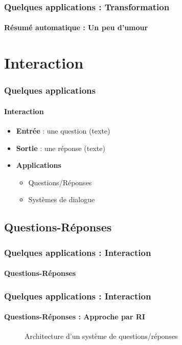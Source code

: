 \documentclass[xcolor=table]{beamer}
\begin{document}
\begin{frame}
	\frametitle{Quelques applications : Transformation}
	\framesubtitle{Résumé automatique : Un peu d'umour}
	
	\begin{center}
	\end{center}
	
\end{frame}

\section{Interaction}

\begin{frame}
	\frametitle{Quelques applications}
	\framesubtitle{Interaction}
	\begin{itemize}
		\item \textbf{Entrée} : une question (texte)
		\item \textbf{Sortie} : une réponse (texte)
		\item \textbf{Applications} 
		\begin{itemize}
			\item Questions/Réponses
			\item Systèmes de dialogue
		\end{itemize}
	\end{itemize}
\end{frame}

\subsection{Questions-Réponses}

\begin{frame}
	\frametitle{Quelques applications : Interaction}
	\framesubtitle{Questions-Réponses}
\end{frame}

\begin{frame}
	\frametitle{Quelques applications : Interaction}
	\framesubtitle{Questions-Réponses : Approche par RI}
	
	\begin{figure}
		\caption{Architecture d'un système de questions/réponses \cite{2019-jurafsky-martin}}
	\end{figure}
	
\end{frame}
\end{document}

